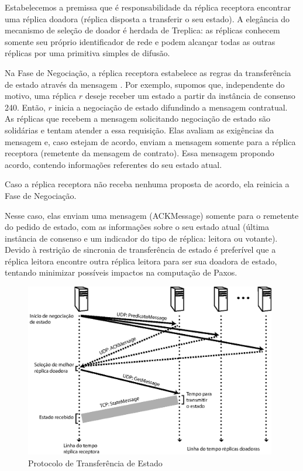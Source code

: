 Estabelecemos a premissa que é responsabilidade da réplica receptora encontrar uma réplica
doadora (réplica disposta a transferir o seu estado). A elegância do mecanismo de seleção
de doador é herdada de Treplica: as réplicas conhecem somente seu próprio identificador de
rede e podem alcançar todas as outras réplicas por uma primitiva simples de difusão.

Na Fase de Negociação, a réplica receptora estabelece as regras da transferência de estado
através da mensagem . Por exemplo, supomos que, independente do
motivo, uma réplica $r$ deseje receber um estado a partir da instância de consenso 240.
Então, $r$ inicia a negociação de estado difundindo a mensagem contratual. As réplicas que
recebem a mensagem solicitando negociação de estado são solidárias e tentam atender a essa
requisição. Elas avaliam as exigências da mensagem e, caso estejam de acordo, enviam a
mensagem  somente para a réplica receptora (remetente da mensagem
de contrato). Essa mensagem propondo acordo, contendo informações referentes do seu estado
atual.

Caso a réplica receptora não receba nenhuma proposta de acordo, ela reinicia a Fase de
Negociação.

Nesse caso, elas enviam uma mensagem (ACKMessage) somente para o remetente
do pedido de estado, com as informações sobre o seu estado atual (última instância de
consenso e um indicador do tipo de réplica: leitora ou votante). Devido à restrição de
sincronia de transferência de estado é preferível que a réplica leitora encontre outra
réplica leitora para ser sua doadora de estado, tentando minimizar possíveis impactos na
computação de Paxos.

\begin{figure}[ht]
  \centering
  \includegraphics[width=11cm]{conteudo/capitulos/figuras/transferencia_estado.eps}
  \caption{Protocolo de Transferência de Estado}
  \label{fig:protocolo}
\end{figure}

